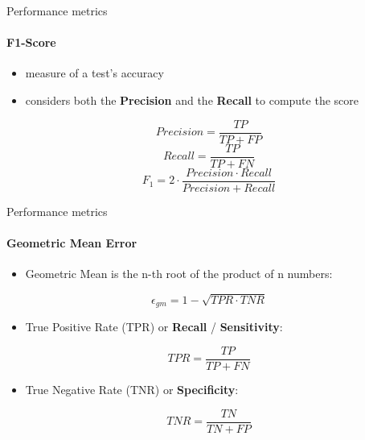 
\begin{frame}{Performance metrics}
\framesubtitle{F1-Score}

\begin{itemize}
    \item measure of a test's accuracy
    \item considers both the \textbf{Precision} and the \textbf{Recall} to compute the score
\end{itemize}

$$ Precision=\frac{TP}{TP+FP} $$
$$ Recall=\frac{TP}{TP+FN} $$
$$ F_1=2\cdot{}\frac{Precision\cdot{}Recall}{Precision+Recall} $$

\end{frame}


\begin{frame}{Performance metrics}
\framesubtitle{Geometric Mean Error}

\begin{itemize}
    \item Geometric Mean is the n-th root of the product of n numbers:
\end{itemize}

$$ \epsilon_{gm}=1-\sqrt{TPR\cdot{}TNR} $$

\begin{itemize}
    \item True Positive Rate (TPR) or \textbf{Recall} / \textbf{Sensitivity}:
\end{itemize}

$$ TPR=\frac{TP}{TP+FN} $$

\begin{itemize}
    \item True Negative Rate (TNR) or \textbf{Specificity}:
\end{itemize}

$$ TNR=\frac{TN}{TN+FP} $$

\end{frame}


